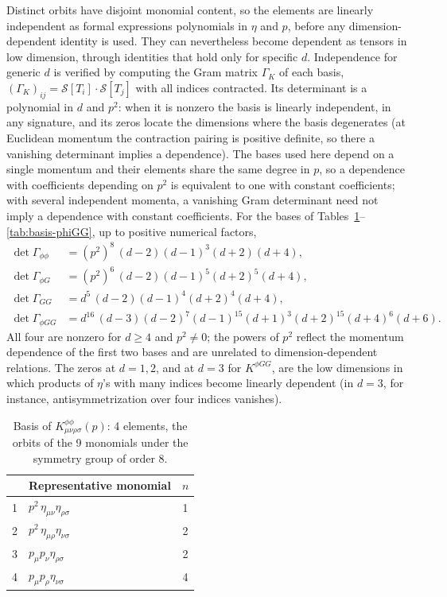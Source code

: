\documentclass[prd,aps,preprint,superscriptaddress,nofootinbib,amsmath,amssymb,eqsecnum]{revtex4-2}
\providecommand{\DIFaddtex}[1]{{\protect\color{blue} \sf #1}} %
\providecommand{\DIFdeltex}[1]{{\protect\color{red} \scriptsize #1}} %
\providecommand{\DIFaddbegin}{} %
\providecommand{\DIFaddend}{} %
\providecommand{\DIFdelbegin}{} %
\providecommand{\DIFdelend}{} %
\providecommand{\DIFadd}[1]{\texorpdfstring{\DIFaddtex{#1}}{#1}} %
\providecommand{\DIFdel}[1]{\texorpdfstring{\DIFdeltex{#1}}{}} %
\begin{document}
Distinct orbits have disjoint monomial content, so the elements are linearly independent as
\DIFdelbegin \DIFdel{formal expressions}\DIFdelend \DIFaddbegin \DIFadd{polynomials in $\eta$ and $p$, before any dimension-dependent identity is used}\DIFaddend . They can nevertheless become dependent as tensors in low dimension,
through identities that hold only for specific $d$. Independence for generic $d$ is verified by
computing the Gram matrix $\Gamma_K$ of each basis, $(\Gamma_K)_{ij}=\mathcal{S}[T_i]\cdot\mathcal{S}[T_j]$
with all indices contracted. Its determinant is a polynomial in $d$ and $p^2$: when it is
nonzero the basis is linearly independent, in any signature, and its zeros locate the
dimensions where the basis degenerates (at Euclidean momentum the contraction pairing is
positive definite, so there a vanishing determinant implies a dependence). The bases used
here depend on a single momentum and their elements share the same degree in $p$, so a
dependence with coefficients depending on $p^2$ is equivalent to one with constant
coefficients; with several independent momenta, a vanishing Gram determinant need not imply
a dependence with constant coefficients. For the bases of Tables~\ref{tab:basis-phiphi}--\ref{tab:basis-phiGG}, up to
positive numerical factors,
\begin{align}
\det\Gamma_{\phi\phi}&=(p^2)^8\,(d-2)(d-1)^3(d+2)(d+4),\\
\det\Gamma_{\phi G}&=(p^2)^6\,(d-2)(d-1)^5(d+2)^5(d+4),\\
\det\Gamma_{GG}&=d^5\,(d-2)(d-1)^4(d+2)^4(d+4),\\
\det\Gamma_{\phi GG}&=d^{16}\,(d-3)(d-2)^7(d-1)^{15}(d+1)^3(d+2)^{15}(d+4)^6(d+6).
\end{align}
All four are nonzero for $d\geq4$ and $p^2\neq0$; the powers of $p^2$ reflect the momentum
dependence of the first two bases and are unrelated to dimension-dependent relations. The
zeros at $d=1,2$, and at $d=3$ for $K^{\phi GG}$,
are the low dimensions in which products of $\eta$'s with many indices become linearly
dependent (in $d=3$, for instance, antisymmetrization over four indices vanishes).

\begin{table}[htb]
\centering
\begin{tabular}{@{}cl c@{}}
\toprule
& Representative monomial & $n$ \\
\midrule
1 & $p^2\,\eta_{\mu\nu}\eta_{\rho\sigma}$ & 1 \\
2 & $p^2\,\eta_{\mu\rho}\eta_{\nu\sigma}$ & 2 \\
3 & $p_{\mu}p_{\nu}\eta_{\rho\sigma}$ & 2 \\
4 & $p_{\mu}p_{\rho}\eta_{\nu\sigma}$ & 4 \\
\bottomrule
\end{tabular}
\caption{Basis of $K^{\phi\phi}_{\mu\nu\rho\sigma}(p)$: 4 elements, the orbits of the 9 monomials
under the symmetry group of order 8.}
\label{tab:basis-phiphi}
\end{table}
\end{document}
